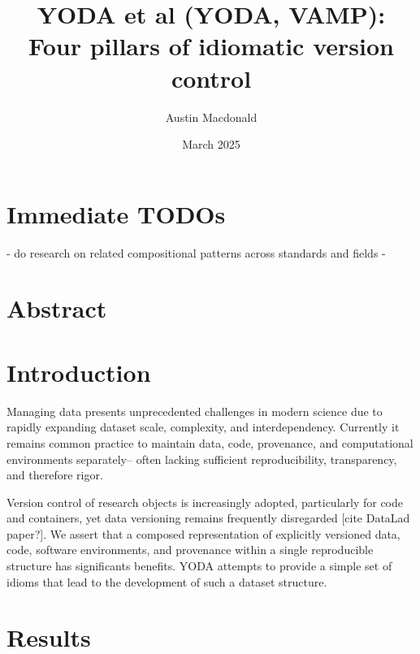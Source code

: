 \documentclass{article}
\title{YODA et al (YODA, VAMP): Four pillars of idiomatic version control}
\author{Austin Macdonald}
\date{March 2025}
\begin{document}
\maketitle

\section{Immediate TODOs}

- do research on related compositional patterns across standards and fields
- 

\section{Abstract}


\section{Introduction}

Managing data presents unprecedented challenges in modern science due to rapidly expanding dataset scale, complexity, and interdependency.
Currently it remains common practice to maintain data, code, provenance, and computational environments separately-- often lacking sufficient reproducibility, transparency, and therefore rigor.

Version control of research objects is increasingly adopted, particularly for code and containers, yet data versioning remains frequently disregarded [cite DataLad paper?].
We assert that a composed representation of explicitly versioned data, code, software environments, and provenance within a single reproducible structure has significants benefits.
YODA attempts to provide a simple set of idioms that lead to the development of such a dataset structure.



\section{Results}
\end{document}
